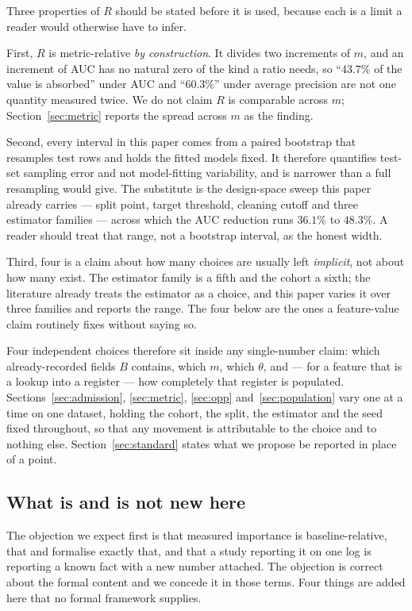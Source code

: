 \documentclass[preprint,12pt]{elsarticle}
\begin{document}
Three properties of $R$ should be stated before it is used, because each is a
limit a reader would otherwise have to infer.

First, $R$ is metric-relative \emph{by construction}. It divides two
increments of $m$, and an increment of AUC has no natural zero of the kind a
ratio needs, so ``$43.7\%$ of the value is absorbed'' under AUC and
``$60.3\%$'' under average precision are not one quantity measured twice. We do not
claim $R$ is comparable across $m$; Section~\ref{sec:metric} reports the
spread across $m$ as the finding.

Second, every interval in this paper comes from a paired bootstrap that
resamples test rows and holds the fitted models fixed. It therefore quantifies
test-set sampling error and not model-fitting variability, and is narrower
than a full resampling would give. The substitute is the design-space sweep
this paper already carries --- split point, target threshold, cleaning cutoff
and three estimator families --- across which the AUC reduction runs $36.1\%$
to $48.3\%$. A reader should treat that range, not a bootstrap interval, as
the honest width.

Third, four is a claim about how many choices are usually left \emph{implicit},
not about how many exist. The estimator family is a fifth and the cohort a
sixth; the literature already treats the estimator as a choice, and this paper
varies it over three families and reports the range. The four below are the
ones a feature-value claim routinely fixes without saying so.

Four independent choices therefore sit inside any single-number claim: which
already-recorded fields $B$ contains, which $m$, which $\theta$, and --- for a
feature that is a lookup into a register --- how completely that register is
populated. Sections~\ref{sec:admission}, \ref{sec:metric}, \ref{sec:opp}
and~\ref{sec:population} vary one at a time on one dataset, holding the cohort,
the split, the estimator and the seed fixed throughout, so that any movement
is attributable to the choice and to nothing else.
Section~\ref{sec:standard} states what we propose be reported in place of a
point.

\subsection{What is and is not new here}
The objection we expect first is that measured importance is baseline-relative,
that \citet{williamson2023vimp} and \citet{covert2020sage} formalise exactly
that, and that a study reporting it on one log is reporting a known fact with
a new number attached. The objection is correct about the formal content and
we concede it in those terms. Four things are added here that no formal
framework supplies.
\end{document}
